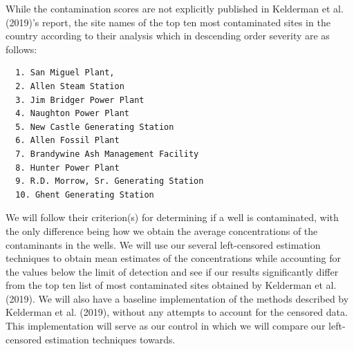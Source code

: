 \documentclass[12pt, twoside]{amherstthesis}
\begin{document}
While the contamination scores are not explicitly published in Kelderman et al. (2019)'s report, the site names of the top ten most contaminated sites in the country according to their analysis which in descending order severity are as follows:
\begin{verbatim}
  1. San Miguel Plant,
  2. Allen Steam Station
  3. Jim Bridger Power Plant
  4. Naughton Power Plant
  5. New Castle Generating Station
  6. Allen Fossil Plant
  7. Brandywine Ash Management Facility
  8. Hunter Power Plant
  9. R.D. Morrow, Sr. Generating Station
  10. Ghent Generating Station
\end{verbatim}
We will follow their criterion(s) for determining if a well is contaminated, with the only difference being how we obtain the average concentrations of the contaminants in the wells. We will use our several left-censored estimation techniques to obtain mean estimates of the concentrations while accounting for the values below the limit of detection and see if our results significantly differ from the top ten list of most contaminated sites obtained by Kelderman et al. (2019). We will also have a baseline implementation of the methods described by Kelderman et al. (2019), without any attempts to account for the censored data. This implementation will serve as our control in which we will compare our left-censored estimation techniques towards.
\end{document}
